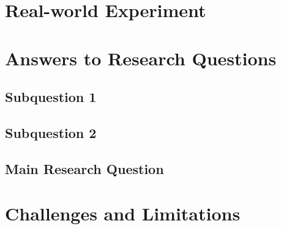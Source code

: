 

\section{Real-world Experiment}
\label{sec:Discussion:Real}



\section{Answers to Research Questions}
\label{sec:Discussion:Answers}

\subsection{Subquestion 1} %
\label{sec:Discussion:Answers:1}


\subsection{Subquestion 2} %
\label{sec:Discussion:Answers:2}

\subsection{Main Research Question} %
\label{sec:Discussion:Answers:Main}


\section{Challenges and Limitations}
\label{sec:Discussion:Challenges}

